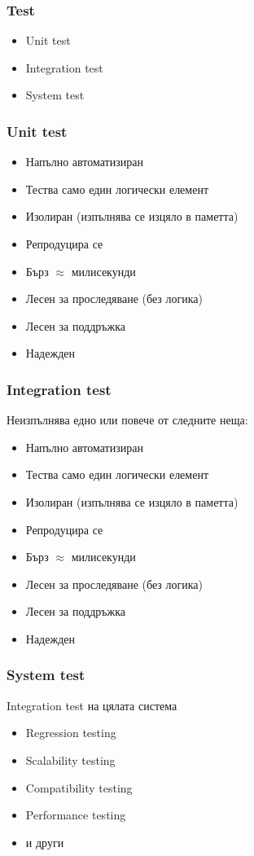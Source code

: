 \begin{frame}
  \frametitle{Test}
  \begin{itemize}
    \item Unit test
    \item Integration test
    \item System test
  \end{itemize}
\end{frame}


\begin{frame}
  \frametitle{Unit test}
  \begin{itemize}
    \item Напълно автоматизиран 
    \item Тества само един логически елемент 
    \item Изолиран (изпълнява се изцяло в паметта) 
    \item Репродуцира се 
    \item Бърз $\approx$ милисекунди 
    \item Лесен за проследяване (без логика) 
    \item Лесен за поддръжка 
    \item Надежден 
  \end{itemize}
\end{frame}


\begin{frame}
  \frametitle{Integration test}
  Неизпълнява едно или повече от следните неща: 
  \begin{itemize}
    \item Напълно автоматизиран 
    \item Тества само един логически елемент 
    \item Изолиран (изпълнява се изцяло в паметта) 
    \item Репродуцира се 
    \item Бърз $\approx$ милисекунди 
    \item Лесен за проследяване (без логика) 
    \item Лесен за поддръжка 
    \item Надежден 
  \end{itemize}
\end{frame}


\begin{frame}
  \frametitle{System test}
  Integration test на цялата система
  \begin{itemize}
    \item Regression testing
    \item Scalability testing
    \item Compatibility testing
    \item Performance testing
    \item и други
  \end{itemize}
\end{frame}
